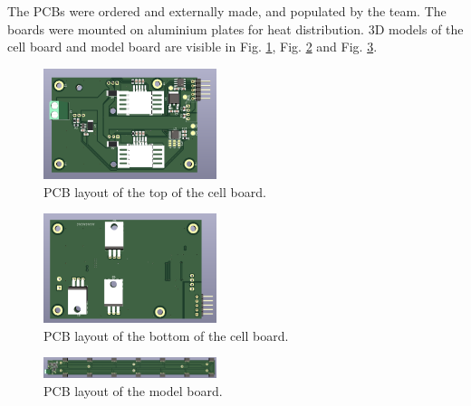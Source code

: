The PCBs were ordered and externally made, and populated by the 
team. The boards were mounted on aluminium plates for heat 
distribution. 3D models of the cell board and model board are 
visible in Fig. \ref{fig:pcb_top_cellboard}, Fig. \ref{fig:pcb_bottom_cellboard}
and Fig. \ref{fig:pcb_modelboard}.
\FloatBarrier
\begin{figure}[h]
    \centering
    \includegraphics[width=0.45\textwidth]{pcb_cell_board_top.png}
    \caption{PCB layout of the top of the cell board.}
    \label{fig:pcb_top_cellboard}
\end{figure}
\FloatBarrier
\begin{figure}[h]
    \centering
    \includegraphics[width=0.45\textwidth]{pcb_cell_board_bottom.png}
    \caption{PCB layout of the bottom of the cell board.}
    \label{fig:pcb_bottom_cellboard}
\end{figure}
\FloatBarrier
\begin{figure}[h]
    \centering
    \includegraphics[width=0.45\textwidth]{pcb_model_board_top.png}
    \caption{PCB layout of the model board.}
    \label{fig:pcb_modelboard}
\end{figure}
\FloatBarrier